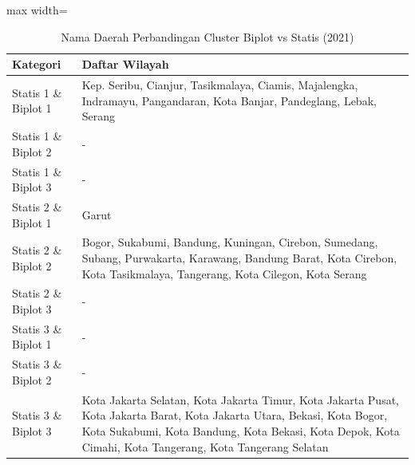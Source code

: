 \begin{table}[H]
\centering
\caption{Nama Daerah Perbandingan Cluster Biplot vs Statis (2021)} \label{tab:appbiplot_statis_name_2021}
\begin{adjustbox}{max width=\textwidth}
\begin{tabular}{|p{4cm}|p{10cm}|}
\hline
\textbf{Kategori} & \textbf{Daftar Wilayah} \\
\hline
Statis 1 \& Biplot 1 & Kep. Seribu, Cianjur, Tasikmalaya, Ciamis, Majalengka, Indramayu, Pangandaran, Kota Banjar, Pandeglang, Lebak, Serang \\
\hline
Statis 1 \& Biplot 2 & - \\
\hline
Statis 1 \& Biplot 3 & - \\
\hline
Statis 2 \& Biplot 1 & Garut \\
\hline
Statis 2 \& Biplot 2 & Bogor, Sukabumi, Bandung, Kuningan, Cirebon, Sumedang, Subang, Purwakarta, Karawang, Bandung Barat, Kota Cirebon, Kota Tasikmalaya, Tangerang, Kota Cilegon, Kota Serang \\
\hline
Statis 2 \& Biplot 3 & - \\
\hline
Statis 3 \& Biplot 1 & - \\
\hline
Statis 3 \& Biplot 2 & - \\
\hline
Statis 3 \& Biplot 3 & Kota Jakarta Selatan, Kota Jakarta Timur, Kota Jakarta Pusat, Kota Jakarta Barat, Kota Jakarta Utara, Bekasi, Kota Bogor, Kota Sukabumi, Kota Bandung, Kota Bekasi, Kota Depok, Kota Cimahi, Kota Tangerang, Kota Tangerang Selatan \\
\hline
\end{tabular}
\end{adjustbox}
\end{table}